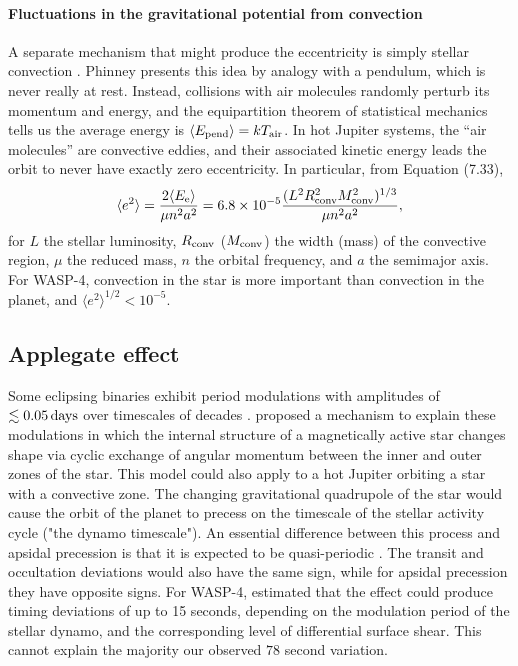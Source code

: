 \documentclass[12pt,twocolumn,tighten]{aastex62}
\begin{document}
\paragraph{Fluctuations in the gravitational potential from convection}
A separate mechanism that might produce the eccentricity is simply stellar
convection \citep[][Section 7]{phinney_pulsars_1992}.
Phinney presents this idea by analogy with a pendulum, which is never really at
rest. Instead, collisions with air molecules randomly perturb its momentum and
energy, and the equipartition theorem of statistical mechanics tells
us the average energy is $\langle E_{\rm pend} \rangle = k
T_{\rm air}$. 
In hot Jupiter systems, the ``air molecules'' are convective eddies, and
their associated kinetic energy leads the orbit to never have exactly zero
eccentricity.
In particular, from \citealt{phinney_pulsars_1992} Equation (7.33),
\begin{equation}
  \langle e^2 \rangle =
  \frac{ 2 \langle E_{\rm e} \rangle }{\mu n^2 a^2}
  = 6.8\times10^{-5}
  \frac{(L^2 R_{\rm conv}^2 M_{\rm conv}^2)^{1/3}}{\mu n^2 a^2},
\end{equation}
for $L$ the stellar luminosity, $R_{\rm conv}$ ($M_{\rm conv}$) the
width (mass) of the convective region,  $\mu$ the reduced mass, $n$
the orbital frequency, and $a$ the semimajor axis.
For WASP-4, convection in the star is more important than
convection in the planet, and
$\langle e^2 \rangle^{1/2} < 10^{-5}$.


\subsection{Applegate effect}
Some eclipsing binaries exhibit period modulations with amplitudes of 
$\lesssim 0.05\,{\rm days}$ over timescales of decades \citep[{\it
e.g.},][]{soderhjelm_geometry_1980,hall_relation_1989}.
\citet{applegate_mechanism_1992} proposed a mechanism to explain these
modulations in which the internal structure of a magnetically active star
changes shape via cyclic exchange of angular momentum between the inner and
outer zones of the star.
This model could also apply to a hot Jupiter orbiting a star with a
convective zone.
The changing gravitational quadrupole of the star would cause the orbit of the
planet to precess on the timescale of the stellar activity cycle
("the dynamo timescale").
An essential difference between this process and apsidal precession is
that it is expected to be quasi-periodic \citep[{\it e.g.},][Figure~12]{soderhjelm_geometry_1980}.
The transit and occultation deviations would also have the same sign, while
for apsidal precession they have opposite signs.
For WASP-4, \citet{watson_orbital_2010} estimated that the effect
could produce timing deviations of up to 15 seconds, depending on the
modulation period of the stellar dynamo, and the corresponding level
of differential surface shear.
This cannot explain the majority our observed $78$ second variation.
\end{document}
